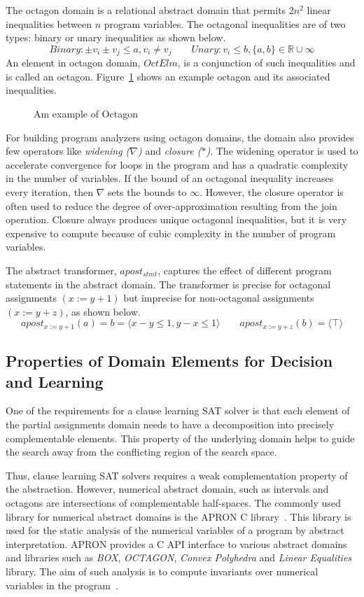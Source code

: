 The octagon domain is a relational abstract domain that permits $2n^2$ 
linear inequalities between $n$ program variables.  The octagonal 
inequalities are of two types: binary or unary inequalities as shown below.
\[Binary: \pm v_i \pm v_j \leq a, v_i \neq v_j \qquad Unary: v_i \leq b, \{a, b\} \in \mathbb{R} \cup \infty \]  
An element in octagon domain, $OctElm$, is a conjunction of such 
inequalities and is called an octagon.  Figure~\ref{octagon} shows an 
example octagon and its associated inequalities.   
%
\begin{wrapfigure}{r}{5.5cm}
\caption{Am example of Octagon}\label{octagon}
\end{wrapfigure} 
%
For building program analyzers using octagon domains, the domain also 
provides few operators like {\em widening ($\nabla$)} and {\em closure ($*$)}.  
The widening operator is used to accelerate convergence for loops in the program
and has a quadratic complexity in the number of variables.  If the bound of an 
octagonal inequality increases every iteration, then $\nabla$ sets the bounds 
to $\infty$.  However, the closure operator is often used to reduce the degree 
of over-approximation resulting from the join operation. Closure always produces 
unique octagonal inequalities, but it is very expensive to compute because of 
cubic complexity in the number of program variables.  
 
The abstract transformer, $apost_{stmt}$, captures the effect of different program 
statements in the abstract domain. The transformer is precise for octagonal 
assignments $(x:=y+1)$ but imprecise for non-octagonal assignments $(x:=y+z)$, 
as shown below.
\[apost_{x:=y+1}(a) = b = \langle x-y \leq 1, y-x \leq 1 \rangle \qquad apost_{x:=y+z}(b) = \langle \top \rangle \]  

\subsection{Properties of Domain Elements for Decision and Learning}
One of the requirements for a clause learning SAT solver 
is that each element of the partial assignments domain 
needs to have a decomposition into precisely complementable 
elements.  This property of the underlying domain helps to 
guide the search away from the conflicting region of the 
search space.

Thus, clause learning SAT solvers requires a weak complementation property
of the abstraction.  However, numerical abstract domain,  such as 
intervals and octagons are intersections of complementable half-spaces. 
The commonly used library for numerical abstract domains  
is the APRON C library~\cite{apron}.  This library is 
used for the static analysis of the numerical variables 
of a program by abstract interpretation. APRON provides a 
C API interface to various abstract domains and libraries 
such as {\em BOX}, {\em OCTAGON}, {\em Convex Polyhedra} and
{\em Linear Equalities} library.  The aim of such analysis is 
to compute invariants over numerical variables in the 
program~\cite{se2011}. 

